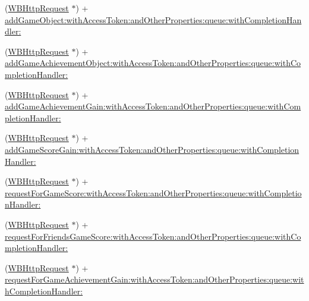 \begin{DoxyCompactItemize}
\item 
(\mbox{\hyperlink{interface_w_b_http_request}{W\+B\+Http\+Request}} $\ast$) + \mbox{\hyperlink{category_w_b_http_request_07_weibo_game_08_ae85dddcb52426ccf3105aecd613c25f1}{add\+Game\+Object\+:with\+Access\+Token\+:and\+Other\+Properties\+:queue\+:with\+Completion\+Handler\+:}}
\item 
(\mbox{\hyperlink{interface_w_b_http_request}{W\+B\+Http\+Request}} $\ast$) + \mbox{\hyperlink{category_w_b_http_request_07_weibo_game_08_a3e9ccee69346b4924f899ce4127e6c24}{add\+Game\+Achievement\+Object\+:with\+Access\+Token\+:and\+Other\+Properties\+:queue\+:with\+Completion\+Handler\+:}}
\item 
(\mbox{\hyperlink{interface_w_b_http_request}{W\+B\+Http\+Request}} $\ast$) + \mbox{\hyperlink{category_w_b_http_request_07_weibo_game_08_a49f7163ca8362f339d37df2b93e36d06}{add\+Game\+Achievement\+Gain\+:with\+Access\+Token\+:and\+Other\+Properties\+:queue\+:with\+Completion\+Handler\+:}}
\item 
(\mbox{\hyperlink{interface_w_b_http_request}{W\+B\+Http\+Request}} $\ast$) + \mbox{\hyperlink{category_w_b_http_request_07_weibo_game_08_a267d11cd3679a39fa49e42efaa9bf301}{add\+Game\+Score\+Gain\+:with\+Access\+Token\+:and\+Other\+Properties\+:queue\+:with\+Completion\+Handler\+:}}
\item 
(\mbox{\hyperlink{interface_w_b_http_request}{W\+B\+Http\+Request}} $\ast$) + \mbox{\hyperlink{category_w_b_http_request_07_weibo_game_08_aebf781874099f199819a90a1f83f06d5}{request\+For\+Game\+Score\+:with\+Access\+Token\+:and\+Other\+Properties\+:queue\+:with\+Completion\+Handler\+:}}
\item 
(\mbox{\hyperlink{interface_w_b_http_request}{W\+B\+Http\+Request}} $\ast$) + \mbox{\hyperlink{category_w_b_http_request_07_weibo_game_08_a07bfa63c702e8a920513d8b0accaf693}{request\+For\+Friends\+Game\+Score\+:with\+Access\+Token\+:and\+Other\+Properties\+:queue\+:with\+Completion\+Handler\+:}}
\item 
(\mbox{\hyperlink{interface_w_b_http_request}{W\+B\+Http\+Request}} $\ast$) + \mbox{\hyperlink{category_w_b_http_request_07_weibo_game_08_aa17d2d459bebe0e5544e64eb307d2098}{request\+For\+Game\+Achievement\+Gain\+:with\+Access\+Token\+:and\+Other\+Properties\+:queue\+:with\+Completion\+Handler\+:}}
\end{DoxyCompactItemize}


